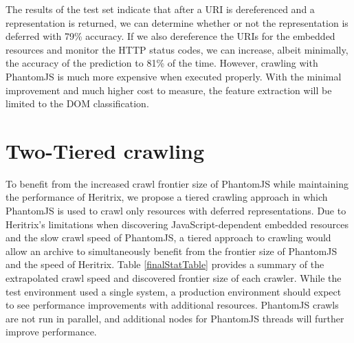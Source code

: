 \documentclass{sig-alternate}
\begin{document}
The results of the test set indicate that after a URI is dereferenced and a representation is returned, we can determine whether or not the representation is deferred with 79\% accuracy. If we also dereference the URIs for the embedded resources and monitor the HTTP status codes, we can increase, albeit minimally, the accuracy of the prediction to 81\% of the time. However, crawling with PhantomJS is much more expensive when executed properly. With the minimal improvement and much higher cost to measure, the feature extraction will be limited to the DOM classification.


\section{Two-Tiered crawling}
\label{frame}

To benefit from the increased crawl frontier size of PhantomJS while maintaining the performance of Heritrix, we propose a tiered crawling approach in which PhantomJS is used to crawl only resources with deferred representations. 
Due to Heritrix's limitations when discovering JavaScript-dependent embedded resources and the slow crawl speed of PhantomJS, a tiered approach to crawling would allow an archive to simultaneously benefit from the frontier size of PhantomJS and the speed of Heritrix. 
Table \ref{finalStatTable} provides a summary of the extrapolated crawl speed and discovered frontier size of each crawler. While the test environment used a single system, a production environment should expect to see performance improvements with additional resources. PhantomJS crawls are not run in parallel, and additional nodes for PhantomJS threads will further improve performance.
\end{document}
